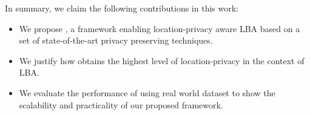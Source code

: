 In summary, we claim the following contributions in this work:

\begin{itemize}
\item We propose \codename, a framework enabling location-privacy aware LBA based on a set of state-of-the-art privacy preserving techniques.
\item We justify how \codename obtains the highest level of location-privacy in the context of LBA.
\item We evaluate the performance of \codename using real world dataset to show the scalability and practicality of our proposed framework.
\end{itemize}


